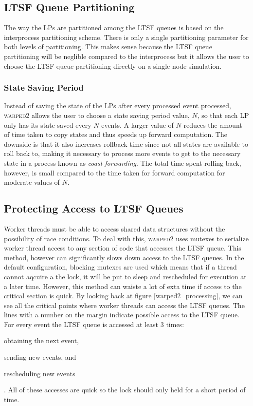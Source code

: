 \documentclass[11pt]{book}
\begin{document}
\subsection{LTSF Queue Partitioning}

The way the LPs are partitioned among the LTSF queues is based on the interprocess partitioning
scheme. There is only a single partitioning parameter for both levels of partitioning. This makes
sense because the LTSF queue partitioning will be neglible compared to the interprocess but
it allows the user to choose the LTSF queue partitioning directly on a single node
simulation. 

\subsubsection{State Saving Period}

Instead of saving the state of the LPs after every processed event processed, \textsc{warped2}
allows the user to choose a state saving period value, $N$, so that each LP only has its state
saved every $N$ events. A larger value of $N$ reduces the amount of time taken to copy states
and thus speeds up forward computation. The downside is that it also increases rollback time
since not all states are available to roll back to, making it necessary to process more events to
get to the necessary state in a process known as \emph{coast forwarding}. The total time spent
rolling back, however, is small compared to the time taken for forward computation for moderate
values of $N$.

\subsection{Protecting Access to LTSF Queues}

Worker threads must be able to access shared data structures without the possibility of
race conditions. To deal with this, \textsc{warped2} uses mutexes to serialize worker thread
access to any section of code that accesses the LTSF queue. This method, however can significantly
slows down access to the LTSF queues. In the default configuration, blocking mutexes are used
which means that if a thread cannot aqcuire a the lock, it will be put to sleep and rescheduled
for execution at a later time. However, this method can waiste a lot of exta time if access to the
critical section is quick. By looking back at figure \ref{warped2_processing}, we can see all
the critical points where worker threads can access the LTSF queues. The lines with a number on
the margin indicate possible access to the LTSF queue. For every event the LTSF queue is accessed
at least 3 times: \begin{inparaenum}[(1)] \item obtaining the next event, \item sending new
events, and \item rescheduling new events \end{inparaenum}. All of these accesses are quick so
the lock should only held for a short period of time.
\end{document}
